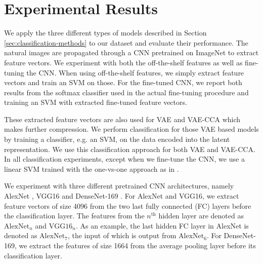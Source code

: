 \section{Experimental Results}\label{paperA:sec:experimental-results}

We apply the three different types of models described in Section \ref{sec:classification-methods} to our dataset and evaluate their performance. The natural images are propagated through a CNN pretrained on ImageNet to extract feature vectors. We experiment with both the off-the-shelf features as well as fine-tuning the CNN. When using off-the-shelf features, we simply extract feature vectors and train an SVM on those. For the fine-tuned CNN, we report both results from the softmax classifier used in the actual fine-tuning procedure and training an SVM with extracted fine-tuned feature vectors.  

These extracted feature vectors are also used for VAE and VAE-CCA which makes further compression. We perform classification for those VAE based models by training a classifier, e.g. an SVM, on the data encoded into the latent representation. We use this classification approach for both VAE and VAE-CCA. In all classification experiments, except when we fine-tune the CNN, we use a linear SVM trained with the one-vs-one approach as in .

We experiment with three different pretrained CNN architectures, namely AlexNet , VGG16  and DenseNet-169 . For AlexNet and VGG16, we extract feature vectors of size 4096 from the two last fully connected (FC) layers before the classification layer. The features from the $n^{\text{th}}$ hidden layer are denoted as $\text{AlexNet}_{n}$ and $\text{VGG16}_{n}$. As an example, the last hidden FC layer in AlexNet is denoted as $\text{AlexNet}_{7}$, the input of which is output from $\text{AlexNet}_{6}$. For DenseNet-169, we extract the features of size 1664 from the average pooling layer before its classification layer.

